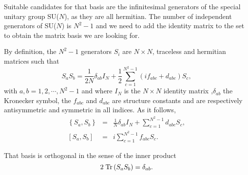 Suitable candidates for that basis are the infinitesimal generators of the special unitary group SU($N$), as they are all hermitian. The number of independent generators of SU($N$) is $N^2-1$ and we need to add the identity matrix to the set to obtain the matrix basis we are looking for.

By definition, the $N^2-1$ generators $S_i$ are $N\times N$, traceless and hermitian matrices such that
\[ S_a S_b = \frac{1}{2N}\delta_{ab}I_N + \frac{1}{2}\sum_{c=1}^{N^2 -1}{(if_{abc} + d_{abc}) S_c},  \]
with $a,b=1,2,\cdots, N^2-1$ and where $I_N$ is the $N\times N$ identity matrix ,$\delta_{ab}$ the Kronecker symbol, the $f_{abc} $ and $d_{abc}$ are structure constants and are respectively antisymmetric and symmetric in all indices. As it follows,
\begin{eqnarray}
  \left\{S_a, S_b\right\} &=&\frac{1}{N}\delta_{ab} I_N+ \sum_{c=1}^{N^2 -1}{d_{abc} S_c}, \\
  \left[S_a, S_b \right] &=& i \sum_{c=1}^{N^2 -1}{f_{abc} S_c}. \label{eq-Scomm}
\end{eqnarray}

That basis is orthogonal in the sense of the inner product
\[ 2\; \mbox{\textup{Tr}}\left( S_a S_b \right) =  \delta_{ab}. \]

